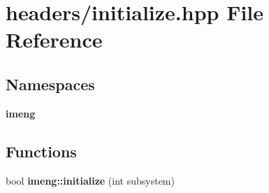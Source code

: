 \section{headers/initialize.hpp File Reference}
\label{initialize_8hpp}
\subsection*{Namespaces}
\begin{DoxyCompactItemize}
\item 
 \textbf{ imeng}
\end{DoxyCompactItemize}
\subsection*{Functions}
\begin{DoxyCompactItemize}
\item 
bool \textbf{ imeng\+::initialize} (int subsystem)
\end{DoxyCompactItemize}

